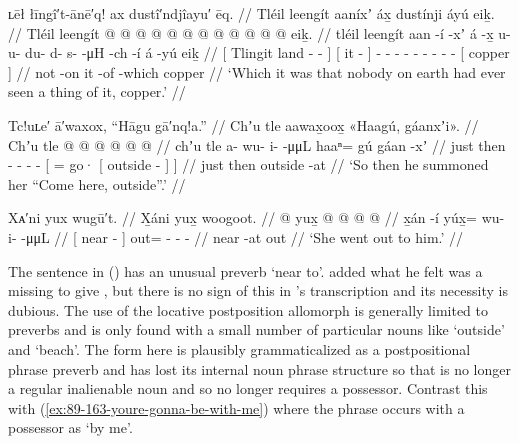 \ex\label{ex:89-159-nobody-seen-copper}%
%
\begingl
	\glpreamble	ʟēł łīngî′t-ānē′q! ax dustî′ndjîayu′ ēq. //
	\glpreamble	Tléil leengít aaníxʼ áx̱ dustínji áyú eiḵ. //
	\gla	Tléil {} leengít  @ {} @ {} {}
		{}  @ {} {}
		 @ {} @ {} @ {} @ {} @ {} @ {} @ {} @ {}
		 @ {}
		{} eiḵ. {} //
	\glb	tléil {} leengít aan -í -xʼ {}
		{} á -x̱ {}
		u- u- du- d- s-  -μH -ch -í
		á -yú
		{} eiḵ {} //
	\glc	{} {}[ Tlingit land - - {}]
		{}[ it - {}]
		- - - - -  - - -
		 -
		{}[ copper {}] //
	\gld	not {}  {} {} -on {}
		{} it -of {}
		 {} {} {} {} {} {} {} -which
		 {}
		{} copper {} //
	\glft	‘Which it was that nobody on earth had ever seen a thing of it, copper.’
		//
\endgl
\xe

\ex\label{ex:89-160-summoned-cmere-outside}%
%
\begingl
	\glpreamble	Tc!uʟe′ ā′waxox, “Hāgu gā′nq!a.” //
	\glpreamble	Chʼu tle aawax̱oox̱ «\!Haagú, gáanxʼi\!». //
	\gla	Chʼu tle  @ {} @ {} @ {} @ {}
		{}  @ {} {}  @ {} {} //
	\glb	chʼu tle a- wu- i-  -μμL
		{} haaⁿ= gú {} gáan -xʼ {} {} //
	\glc	just then - - -  -
		{}[ = go· {}[ outside - {}] {}] //
	\gld	just then  {} {} {} {}
		{}  {} {} outside -at {} //
	\glft	‘So then he summoned her “Come here, outside”.’
		//
\endgl
\xe

\ex\label{ex:89-161-went-out-to-him}%
%
\begingl
	\glpreamble	Xᴀ′ni yux wugū′t. //
	\glpreamble	X̱áni yux̱ woogoot. //
	\gla	{}  @ {} {} yux̱ @  @ {} @ {} @ {} //
	\glb	{} x̱án -í {} yúx̱= wu- i-  -μμL //
	\glc	{}[ near - {}] out= - -  - //
	\gld	{} near -at {} out  {} {} {} //
	\glft	‘She went out to him.’
		//
\endgl
\xe

The sentence in (\lastx) has an unusual preverb  ‘near to’.
\citeauthor{leer:1977} added what he felt was a missing  to give  \parencite[8]{leer:1977}, but there is no sign of this in \citeauthor{swanton:1909}’s transcription and its necessity is dubious.
The use of the locative postposition allomorph  is generally limited to preverbs and is only found with a small number of particular nouns like  ‘outside’ and  ‘beach’.
The form  here is plausibly grammaticalized as a postpositional phrase preverb and has lost its internal noun phrase structure so that  is no longer a regular inalienable noun and so no longer requires a possessor.
Contrast this with (\ref{ex:89-163-youre-gonna-be-with-me}) where the phrase occurs with a possessor as  ‘by me’.

